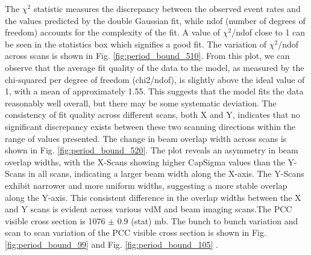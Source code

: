 The $\chi^2$ statistic measures the discrepancy between the observed event rates and the values predicted by the double Gaussian fit, while ndof (number of degrees of freedom) accounts for the complexity of the fit. A value of  $\chi^2$/ndof close to 1 can be seen in the statistics box which signifies a good fit. The variation of $\chi^2$/ndof across scans is shown in Fig. \ref{fig:period_bound_510}. From this plot, we can observe that the average fit quality of the data to the model, as measured by the chi-squared per degree of freedom (chi2/ndof), is slightly above the ideal value of 1, with a mean of approximately 1.55. This suggests that the model fits the data reasonably well overall, but there may be some systematic deviation. The consistency of fit quality across different scans, both X and Y, indicates that no significant discrepancy exists between these two scanning directions within the range of values presented.  The change in beam overlap width across scans is shown in Fig. \ref{fig:period_bound_520}. The plot reveals an asymmetry in beam overlap widths, with the X-Scans showing higher CapSigma values than the Y-Scans in all scans, indicating a larger beam width along the X-axis. The Y-Scans exhibit narrower and more uniform widths, suggesting a more stable overlap along the Y-axis. This consistent difference in the overlap widths between the X and Y scans is evident across various vdM and beam imaging scans.The PCC visible cross section is 1076 $\pm$ 0.9 (stat) mb. The bunch to bunch variation and scan to scan variation of the PCC visible cross section is shown in Fig. \ref{fig:period_bound_99} and Fig. \ref{fig:period_bound_105} \cite{pas_22}. %


